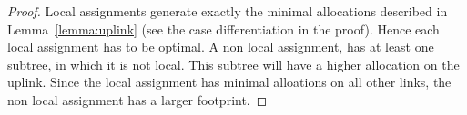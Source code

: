 \documentclass[9pt]{sigcomm-alternate}
\newcommand{\stefan}[1]{\textcolor{blue}{stefan: #1}}
\newcommand{\VmChunkAssignment}{\mu}
\newcommand{\CC}{\textsc{NI}}
\newcommand{\MA}{\textsc{MA}}
\begin{document}
\begin{proof}
Local assignments generate exactly the minimal allocations described in 
Lemma~\ref{lemma:uplink} (see the case differentiation in the proof). Hence 
each local assignment has to be optimal. A non local assignment, has at least 
one subtree, in which it is not local. This subtree will have a higher 
allocation on the uplink. Since the local assignment has minimal alloations 
on all other links, the non local assignment has a larger footprint.
\end{proof}

\end{document}
